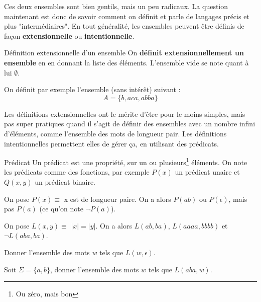 Ces deux ensembles sont bien gentils, mais un peu radicaux. La question maintenant est donc de savoir comment on définit et parle de langages précis et plus "intermédiaires". En tout généralité, les ensembles peuvent être définis de façon \textbf{extensionnelle} ou \textbf{intentionnelle}. 

\begin{definition}{Définition extensionnelle d'un ensemble}{}
On \textbf{définit extensionnellement un ensemble} en en donnant la liste des éléments. L'ensemble vide se note quant à lui $\emptyset$.
\end{definition}

\begin{example} On définit par exemple l'ensemble (sans intérêt) suivant :
\[
    A = \{b, aca, abba\}
\]
\end{example}

Les définitions extensionnelles ont le mérite d'être pour le moins simples, mais pas super pratiques quand il s'agit de définir des ensembles avec un nombre infini d'éléments, comme l'ensemble des mots de longueur pair. Les définitions intentionnelles permettent elles de gérer ça, en utilisant des prédicats.

\begin{definition}{Prédicat}{}
Un prédicat est une propriété, sur un ou plusieurs\footnote{Ou zéro, mais bon} éléments. On note les prédicats comme des fonctions, par exemple $P(x)$ un prédicat unaire et $Q(x,y)$ un prédicat binaire.
\end{definition}

\begin{example}
On pose $P(x) \equiv$ x est de longueur paire. On a alors $P(ab)$ ou $P(\epsilon)$, mais pas $P(a)$ (ce qu'on note $\neg P(a)$). 
\end{example}

\begin{example}
\label{predL}
On pose $L(x,y) \equiv$ $|x| = |y|$. On a alors $L(ab,ba)$, $L(aaaa,bbbb)$ et $\neg L(aba,ba)$.
\end{example}

\begin{exercice}
Donner l'ensemble des mots $w$ tels que $L(w,\epsilon)$. 
\end{exercice}

\begin{exercice}
Soit $\Sigma = \{a,b\}$, donner l'ensemble des mots $w$ tels que $L(aba,w)$. 
\end{exercice}

